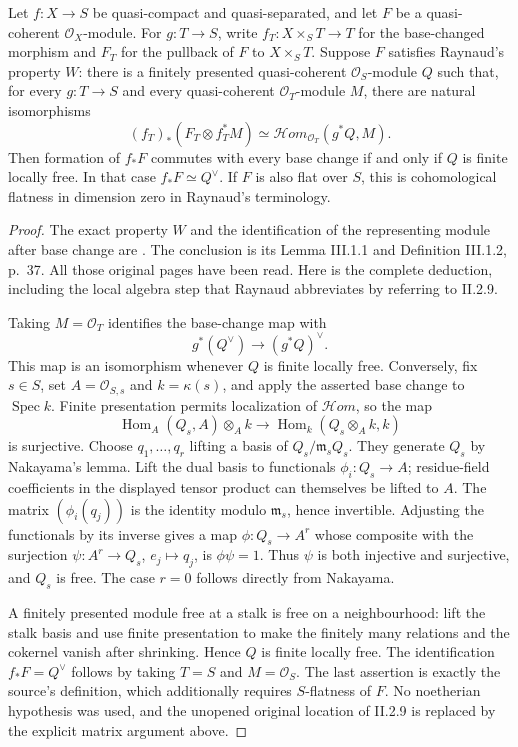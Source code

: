 \begin{theorem}\label{thm:B3-raynaud-flatness}
Let $f:X\to S$ be quasi-compact and quasi-separated, and let $F$ be
a quasi-coherent $\mathcal O_X$-module. For $g:T\to S$, write
$f_T:X\times_S T\to T$ for the base-changed morphism and $F_T$ for
the pullback of $F$ to $X\times_S T$.
Suppose $F$ satisfies Raynaud's property $W$: there is
a finitely presented quasi-coherent $\mathcal O_S$-module $Q$ such that,
for every $g:T\to S$ and every quasi-coherent $\mathcal O_T$-module $M$,
there are natural isomorphisms
\[
 (f_T)_*(F_T\otimes f_T^*M)
    \simeq\mathcal H\!om_{\mathcal O_T}(g^*Q,M).
\]
Then formation of $f_*F$ commutes with every base change if and only if
$Q$ is finite locally free. In that case $f_*F\simeq Q^\vee$.
If $F$ is also flat over $S$, this is cohomological flatness in dimension
zero in Raynaud's terminology.
\end{theorem}
\begin{proof}
The exact property $W$ and the identification of the representing module
after base change are \cite[Lemmas II.1.1--II.1.2 and Definition II.1.3,
pp.~14--15]{BRaynaudThesis1970}. The conclusion is its Lemma III.1.1
and Definition III.1.2, p.~37. All those original pages have been read.
Here is the complete deduction, including the local algebra step that
Raynaud abbreviates by referring to II.2.9.

Taking $M=\mathcal O_T$ identifies the base-change map with
\[
 g^*(Q^\vee)\longrightarrow(g^*Q)^\vee.
\]
This map is an isomorphism whenever $Q$ is finite locally free.
Conversely, fix $s\in S$, set $A=\mathcal O_{S,s}$ and
$k=\kappa(s)$, and apply the asserted base change to $\operatorname{Spec}k$.
Finite presentation permits localization of $\mathcal H\!om$, so the map
\[
 \operatorname{Hom}_A(Q_s,A)\otimes_A k
       \longrightarrow\operatorname{Hom}_k(Q_s\otimes_A k,k)
\]
is surjective. Choose $q_1,\ldots,q_r$ lifting a basis of $Q_s/\mathfrak m_sQ_s$.
They generate $Q_s$ by Nakayama's lemma. Lift the dual basis to
functionals $\phi_i:Q_s\to A$; residue-field coefficients in the displayed
tensor product can themselves be lifted to $A$.
The matrix $(\phi_i(q_j))$ is the identity modulo $\mathfrak m_s$, hence
invertible. Adjusting the functionals by its inverse gives a map
$\phi:Q_s\to A^r$ whose composite with the surjection
$\psi:A^r\to Q_s$, $e_j\mapsto q_j$, is $\phi\psi=1$.
Thus $\psi$ is both injective and surjective, and $Q_s$ is free.
The case $r=0$ follows directly from Nakayama.

A finitely presented module free at a stalk is free on a neighbourhood:
lift the stalk basis and use finite presentation to make the finitely
many relations and the cokernel vanish after shrinking. Hence $Q$ is
finite locally free. The identification $f_*F=Q^\vee$ follows by taking
$T=S$ and $M=\mathcal O_S$. The last assertion is exactly the source's
definition, which additionally requires $S$-flatness of $F$.
No noetherian hypothesis was used, and the unopened original location
of II.2.9 is replaced by the explicit matrix argument above.
\end{proof}

